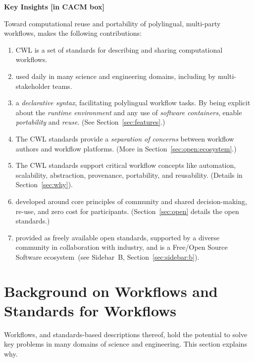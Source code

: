 \documentclass[sigconf,authordraft]{acmart}
\begin{document}
\textbf{Key Insights [in CACM box]}

Toward computational reuse and portability of polylingual, multi-party workflows,  makes the following contributions:

\begin{enumerate}
\item
  {CWL is a set of standards for describing and sharing computational workflows.}
\item
  { used daily in many science and engineering domains, including by multi-stakeholder teams.}
\item
  { a \textit{declarative syntax}, facilitating polylingual workflow tasks. By being explicit about the \textit{runtime environment} and any use of \textit{software containers},  enable \textit{portability} and \textit{reuse}. (See Section~\ref{sec:features}.)}
\item
  {The CWL standards provide a \textit{separation of concerns} between workflow authors and workflow platforms. (More in Section~\ref{sec:open:ecosystem}.)}
\item
  {The CWL standards support critical workflow concepts like automation, scalability, abstraction, provenance, portability, and reusability. (Details in Section~\ref{sec:why}).}
\item
  { developed around core principles of community and shared decision-making, re-use, and zero cost for participants. (Section~\ref{sec:open} details the open standards.)}
\item
  { provided as freely available open standards, supported by a diverse community in collaboration with industry, and is a Free/Open Source Software ecosystem~(see Sidebar~B, Section~\ref{sec:sidebar:b}).}
\end{enumerate}

\section{Background on Workflows and Standards for Workflows}\label{sec:bg}\label{sec:why}

Workflows, and standards-based descriptions thereof, hold the potential to solve key problems in many domains of science and engineering. This section explains why.
\end{document}
